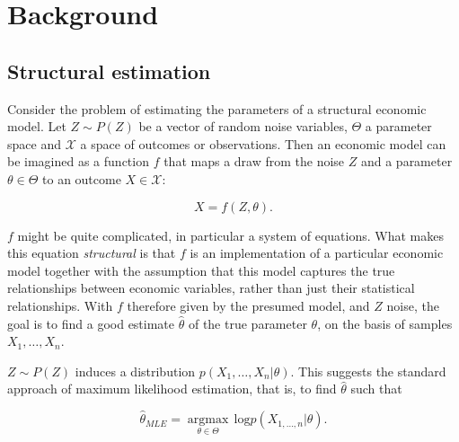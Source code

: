 
\section{Background} %
\label{sec:background}

\subsection{Structural estimation}
\label{sec:structural_estimation}

Consider the problem of estimating the parameters of a structural economic model.
Let $Z \sim P(Z)$ be a vector of random noise variables, $\Theta$ a parameter space and $\mathcal{X}$ a space of outcomes or observations.
Then an economic model can be imagined as a function $f$ that maps a draw from the noise $Z$ and a parameter $\theta \in \Theta$ to an outcome $X \in \mathcal{X}$:

\begin{equation}
    X = f(Z, \theta).
\end{equation}

$f$ might be quite complicated, in particular a system of equations.
What makes this equation \textit{structural} is that $f$ is an implementation of a particular economic model together with the assumption that this model captures the true relationships between economic variables, rather than just their statistical relationships. %
With $f$ therefore given by the presumed model, and $Z$ noise, the goal is to find a good estimate $\hat{\theta}$ of the true parameter $\theta$, on the basis of samples $X_1, \dots, X_n$.

$Z \sim P(Z)$ induces a distribution $p(X_1, \dots, X_n|\theta)$.
This suggests the standard approach of maximum likelihood estimation, that is, to find $\hat{\theta}$ such that

\begin{equation}
    \hat{\theta}_{MLE} = \underset{\theta\in\Theta}{\operatorname{\arg \max}}\,\text{log} p(X_{1, \dots, n}|\theta).
\end{equation}

